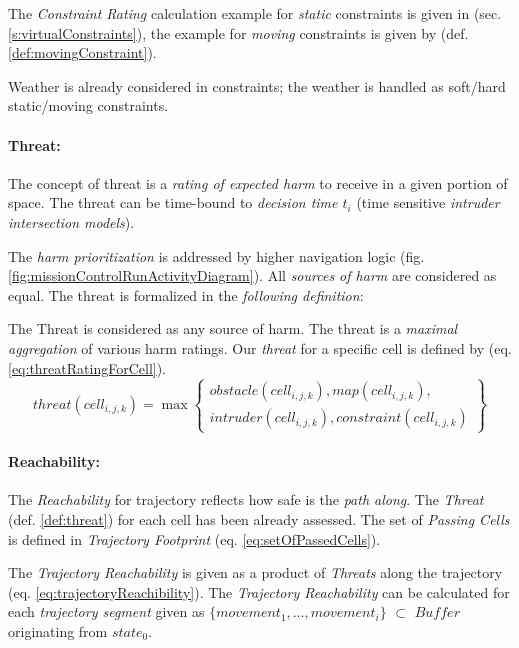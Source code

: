 \noindent The \emph{Constraint Rating} calculation example for \emph{static} constraints is given in (sec. \ref{s:virtualConstraints}), the example for \emph{moving} constraints is given by (def. \ref{def:movingConstraint}).

\begin{note}{Weather}
    is already considered in constraints; the weather is handled as soft/hard static/moving constraints.
\end{note}

\paragraph{Threat:} The concept of threat is a \emph{rating of expected harm} to receive in a given portion of space. The threat can be time-bound to \emph{decision time $t_i$} (time sensitive \emph{intruder intersection models}).

The \emph{harm prioritization} is addressed by higher navigation logic (fig. \ref{fig:missionControlRunActivityDiagram}). All \emph{sources of harm} are considered as equal. The threat is formalized in the \emph{following definition}:

\begin{definition}{The Threat}\label{def:threat} is considered as any source of harm. The threat is a \emph{maximal aggregation} of various harm ratings. Our \emph{threat} for a  specific cell is defined by (eq. \ref{eq:threatRatingForCell}).
    \begin{equation}\label{eq:threatRatingForCell}
        threat(cell_{i,j,k}) = \max\left\{\begin{gathered}obstacle(cell_{i,j,k}),map(cell_{i,j,k}),\\intruder(cell_{i,j,k}),constraint(cell_{i,j,k})\end{gathered}\right\}
    \end{equation}
\end{definition}

\paragraph{Reachability:} The \emph{Reachability} for trajectory reflects how safe is the \emph{path along}. The \emph{Threat} (def. \ref{def:threat}) for each cell has been already assessed.  The set of \emph{Passing Cells} is defined in \emph{Trajectory Footprint} (eq. \ref{eq:setOfPassedCells}).

The \emph{Trajectory Reachability} is given as a product of \emph{Threats} along the trajectory (eq. \ref{eq:trajectoryReachibility}). The \emph{Trajectory Reachability} can be calculated for each \emph{trajectory segment} given as $\{movement_1,\dots,movement_i\}$ $\subset$ $Buffer$ originating from $state_0$.



